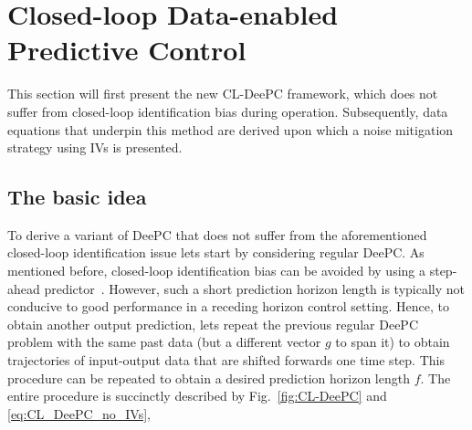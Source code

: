 \section{Closed-loop Data-enabled Predictive Control}
This section will first present the new \ac{CL-DeePC} framework, which does not suffer from closed-loop identification bias during operation. Subsequently, data equations that underpin this method are derived upon which a noise mitigation strategy using \ac{IVs} is presented.

\subsection{The basic idea}
To derive a variant of \ac{DeePC} that does not suffer from the aforementioned closed-loop identification issue lets start by considering regular \ac{DeePC}. As mentioned before, closed-loop identification bias can be avoided by using a step-ahead predictor~\cite{Ljung1996}. However, such a short prediction horizon length is typically not conducive to good performance in a receding horizon control setting. Hence, to obtain another output prediction, lets repeat the previous regular \ac{DeePC} problem with the same past data (but a different vector $g$ to span it) to obtain trajectories of input-output data that are shifted forwards one time step. This procedure can be repeated to obtain a desired prediction horizon length $f$. The entire procedure is succinctly described by Fig.~\ref{fig:CL-DeePC} and \eqref{eq:CL_DeePC_no_IVs}, 
% 
% 
